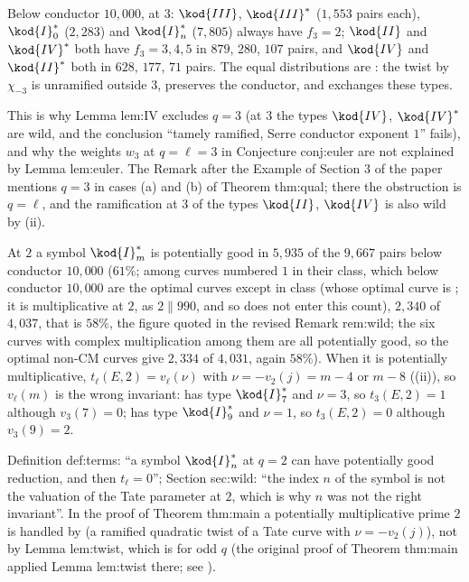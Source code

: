 Below conductor $10{,}000$, at $3$: $\kod{III}$, $\kod{III}^*$ ($1{,}553$ pairs each), $\kod{I}_0^*$ ($2{,}283$) and $\kod{I}_n^*$ ($7{,}805$) always have
$f_3=2$; $\kod{II}$ and $\kod{IV}^*$ both have $f_3=3,4,5$ in $879$, $280$, $107$ pairs, and $\kod{IV}$ and $\kod{II}^*$ both in $628$, $177$, $71$
pairs. The equal distributions are : the twist by $\chi_{-3}$ is unramified outside $3$, preserves the
conductor, and exchanges these types.

\begin{paperlink}
This is why Lemma lem:IV excludes $q=3$ (at $3$ the types $\kod{IV}$, $\kod{IV}^*$ are wild, and the conclusion ``tamely ramified, Serre
conductor exponent $1$'' fails), and why the weights $w_3$ at $q=\ell=3$ in Conjecture conj:euler are not explained by Lemma lem:euler. The
Remark after the Example of Section 3 of the paper mentions $q=3$ in cases (a) and (b) of Theorem thm:qual; there the obstruction is
$q=\ell$, and the ramification at $3$ of the types $\kod{II}$, $\kod{IV}$ is also wild by (ii).
\end{paperlink}

\begin{remark}\label{rem:reduction:Instar-at-2}
At $2$ a symbol $\kod{I}_m^*$ is potentially good in $5{,}935$ of the $9{,}667$ pairs below conductor $10{,}000$ ($61\%$; among curves
numbered $1$ in their class, which below conductor $10{,}000$ are the optimal curves except in class  (whose optimal
curve is ; it is multiplicative at $2$, as $2\parallel990$, and so does not enter this count), $2{,}340$ of $4{,}037$, that is $58\%$, the
figure quoted in the revised Remark rem:wild; the six curves with complex multiplication among them are all potentially good, so the
optimal non-CM curves give $2{,}334$ of $4{,}031$, again $58\%$). When it is
potentially multiplicative, $t_\ell(E,2)=v_\ell(\nu)$ with $\nu=-v_2(j)=m-4$ or $m-8$ ((ii)), so
$v_\ell(m)$ is the wrong invariant:  has type $\kod{I}_7^*$ and $\nu=3$, so $t_3(E,2)=1$ although $v_3(7)=0$;  has
type $\kod{I}_9^*$ and $\nu=1$, so $t_3(E,2)=0$ although $v_3(9)=2$.
\end{remark}

\begin{paperlink}
Definition def:terms: ``a symbol $\kod{I}_n^*$ at $q=2$ can have potentially good reduction, and then $t_\ell=0$''; Section sec:wild: ``the
index $n$ of the symbol is not the valuation of the Tate parameter at $2$, which is why $n$ was not the right invariant''. In the proof of
Theorem thm:main a potentially multiplicative prime $2$ is handled by  (a ramified quadratic
twist of a Tate curve with $\nu=-v_2(j)$), not by Lemma lem:twist, which is for odd $q$ (the original proof of Theorem thm:main applied Lemma lem:twist there;
see ).
\end{paperlink}

